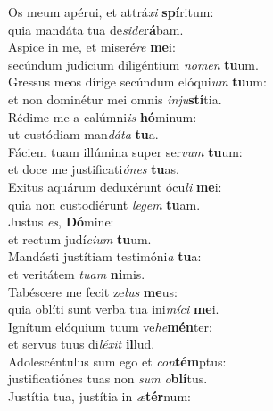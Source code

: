 \oddverse Os meum apérui, et attrá\textit{xi} \textbf{spí}ritum:~\*\\
\oddverse quia mandáta tua de\textit{si}\textit{de}\textbf{rá}bam.\\
\evenverse Aspice in me, et miseré\textit{re} \textbf{me}i:~\*\\
\evenverse secúndum judícium diligéntium \textit{no}\textit{men} \textbf{tu}um.\\
\oddverse Gressus meos dírige secúndum elóqui\textit{um} \textbf{tu}um:~\*\\
\oddverse et non dominétur mei omnis \textit{in}\textit{ju}\textbf{stí}tia.\\
\evenverse Rédime me a calúmni\textit{is} \textbf{hó}minum:~\*\\
\evenverse ut custódiam man\textit{dá}\textit{ta} \textbf{tu}a.\\
\oddverse Fáciem tuam illúmina super ser\textit{vum} \textbf{tu}um:~\*\\
\oddverse et doce me justificati\textit{ó}\textit{nes} \textbf{tu}as.\\
\evenverse Exitus aquárum deduxérunt ócu\textit{li} \textbf{me}i:~\*\\
\evenverse quia non custodiérunt \textit{le}\textit{gem} \textbf{tu}am.\\
\oddverse Justus \textit{es}, \textbf{Dó}mine:~\*\\
\oddverse et rectum judí\textit{ci}\textit{um} \textbf{tu}um.\\
\evenverse Mandásti justítiam testimóni\textit{a} \textbf{tu}a:~\*\\
\evenverse et veritátem \textit{tu}\textit{am} \textbf{ni}mis.\\
\oddverse Tabéscere me fecit ze\textit{lus} \textbf{me}us:~\*\\
\oddverse quia oblíti sunt verba tua ini\textit{mí}\textit{ci} \textbf{me}i.\\
\evenverse Ignítum elóquium tuum ve\textit{he}\textbf{mén}ter:~\*\\
\evenverse et servus tuus di\textit{lé}\textit{xit} \textbf{il}lud.\\
\oddverse Adolescéntulus sum ego et \textit{con}\textbf{tém}ptus:~\*\\
\oddverse justificatiónes tuas non \textit{sum} \textit{o}\textbf{blí}tus.\\
\evenverse Justítia tua, justítia in \textit{æ}\textbf{tér}num:~\*\\
